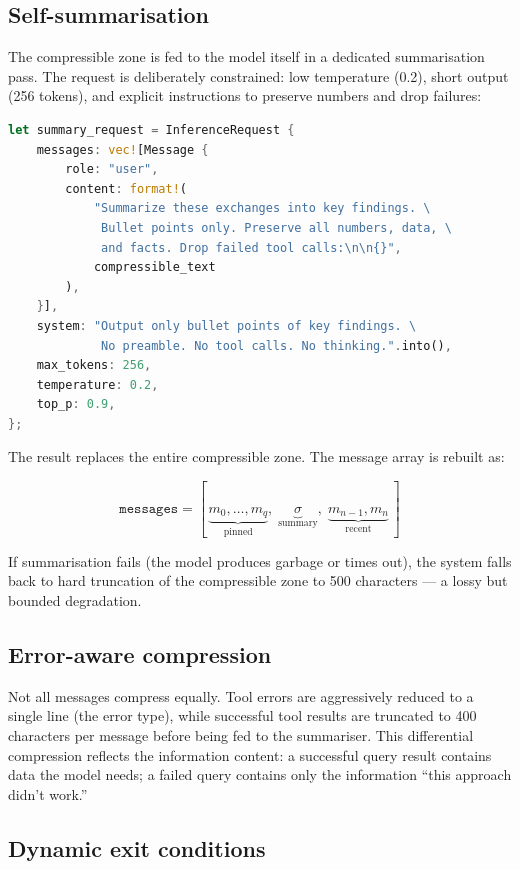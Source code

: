 \documentclass[11pt,a4paper]{article}
\begin{document}
\subsection{Self-summarisation}

The compressible zone is fed to the model itself in a dedicated summarisation pass. The request is deliberately constrained: low temperature (0.2), short output (256 tokens), and explicit instructions to preserve numbers and drop failures:

\begin{lstlisting}[language=Rust, caption={Summarisation request construction}]
let summary_request = InferenceRequest {
    messages: vec![Message {
        role: "user",
        content: format!(
            "Summarize these exchanges into key findings. \
             Bullet points only. Preserve all numbers, data, \
             and facts. Drop failed tool calls:\n\n{}",
            compressible_text
        ),
    }],
    system: "Output only bullet points of key findings. \
             No preamble. No tool calls. No thinking.".into(),
    max_tokens: 256,
    temperature: 0.2,
    top_p: 0.9,
};
\end{lstlisting}

\noindent The result replaces the entire compressible zone. The message array is rebuilt as:

\[
\texttt{messages} = [\,\underbrace{m_0, \ldots, m_q}_{\text{pinned}},\; \underbrace{\sigma}_{\text{summary}},\; \underbrace{m_{n-1}, m_n}_{\text{recent}}\,]
\]

\noindent If summarisation fails (the model produces garbage or times out), the system falls back to hard truncation of the compressible zone to 500 characters --- a lossy but bounded degradation.

\subsection{Error-aware compression}

Not all messages compress equally. Tool errors are aggressively reduced to a single line (the error type), while successful tool results are truncated to 400 characters per message before being fed to the summariser. This differential compression reflects the information content: a successful query result contains data the model needs; a failed query contains only the information ``this approach didn't work.''

\subsection{Dynamic exit conditions}
\end{document}
